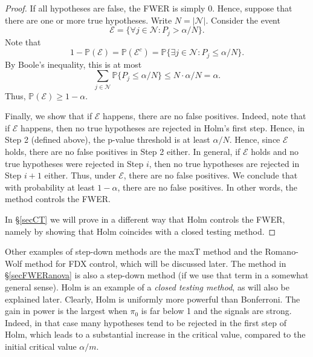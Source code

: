 \documentclass[11pt]{article}
\theoremstyle{plain}
\theoremstyle{definition}
\newcommand{\N}{\mathcal{N}}
\newcommand{\E}{\mathcal{E}}
\newcommand{\pr}{\mathbb{P}}
\begin{document}
\begin{proof}
If all hypotheses are false, the FWER is simply 0. Hence, suppose that there are one or more true hypotheses. Write $N=|\N|$. Consider the event
$$\E= \{\forall j\in \N: P_j> \alpha/N\}.$$
Note that $$1-\pr(\E) =\pr(\E^c) = \pr\{\exists j\in \N: P_j\leq \alpha/N\}. $$
By Boole's inequality, this is at most
$$ \sum_{j\in\N}  \pr\{ P_j\leq \alpha/N \}\leq N \cdot \alpha/N=\alpha.$$
Thus, $\pr(\E)\geq 1-\alpha$.

Finally, we show that if $\E$ happens, there are no false positives.
Indeed, note that if $\E$ happens, then no true hypotheses are rejected in Holm's first step.
Hence, in Step 2 (defined above), the p-value threshold is at least $\alpha/N$. Hence, since  $\E$  holds, there are no false positives in Step 2 either. 
In general, if $\E$ holds and no true hypotheses were rejected in Step $i$, then no true hypotheses are rejected in Step $i+1$ either. Thus, under $\E$, there are no false positives. We conclude that with probability at least $1-\alpha$, there are no false positives. In other words, the method controls the FWER. 

In \S\ref{secCT} we will prove in a different way that Holm controls the FWER, namely by showing that Holm coincides with a closed testing method.
\end{proof}

Other examples of step-down methods are the maxT method and the Romano-Wolf method for FDX control, which will be discussed later. The method  in \S\ref{secFWERanova} is also a step-down method (if we use that term in a somewhat general sense).    Holm is an example of a  \emph{closed testing method}, as will also be explained later. Clearly, Holm is uniformly more powerful than Bonferroni. The gain in power is the largest when $\pi_0$ is far below 1 and the signals are strong. Indeed, in that case many hypotheses tend to be rejected in the first step of Holm, which leads to a substantial increase in the critical value, compared to the initial critical value $\alpha/m.$
\end{document}
